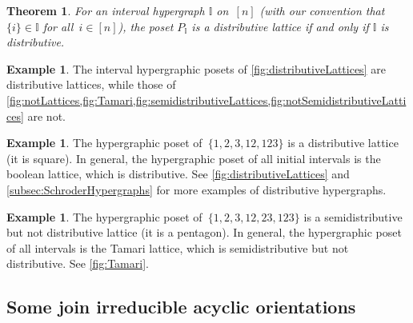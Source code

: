 \documentclass{amsart}
\newtheorem{theoremA}{Theorem}
\theoremstyle{definition}
\newtheorem{example}[theorem]{Example}
\newcommand{\II}{\mathbb I} %
\begin{document}
\begin{theoremA}
For an interval hypergraph $\II$ on~$[n]$ (with our convention that~$\{i\} \in \II$ for all~$i \in [n]$), the poset $P_\II$ is a distributive lattice if and only if $\II$ is distributive.
\end{theoremA}

\begin{example}
The interval hypergraphic posets of \cref{fig:distributiveLattices} are distributive lattices, while those of \cref{fig:notLattices,fig:Tamari,fig:semidistributiveLattices,fig:notSemidistributiveLattices} are not.
\end{example}

\begin{example}
The hypergraphic poset of~$\{ 1, 2, 3, 12, 123\}$ is a distributive lattice (it is square).
In general, the hypergraphic poset of all initial intervals is the boolean lattice, which is distributive.
See \cref{fig:distributiveLattices} and \cref{subsec:SchroderHypergraphs} for more examples of distributive hypergraphs.
\end{example}

\begin{example}
The hypergraphic poset of~$\{ 1, 2, 3, 12, 23, 123 \}$ is a semidistributive but not distributive lattice (it is a pentagon).
In general, the hypergraphic poset of all intervals is the Tamari lattice, which is semidistributive but not distributive.
See \cref{fig:Tamari}.
\end{example}


\subsection{Some join irreducible acyclic orientations}  
\label{subsec:someJoinIrreducibles}
\end{document}
